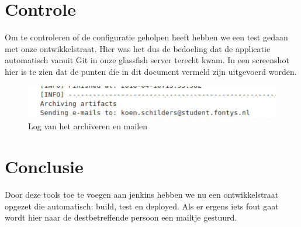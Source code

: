 \documentclass[12pt]{article}
\begin{document}
\section{Controle}
Om te controleren of de configuratie geholpen heeft hebben we een test gedaan met onze ontwikkelstraat. Hier was het dus de bedoeling dat de applicatie automatisch vanuit Git in onze glassfish server terecht kwam. In een screenshot hier is te zien dat de punten die in dit document vermeld zijn uitgevoerd worden.

\begin{figure}[H]
	\includegraphics[width=\textwidth]{images/Archivingandsendingemails.png}
	\caption{Log van het archiveren en mailen\label{fig:log}}
\end{figure}

\newpage
\section{Conclusie}
Door deze tools toe te voegen aan jenkins hebben we nu een ontwikkelstraat opgezet die automatisch: build, test en deployed. Als er ergens iets fout gaat wordt hier naar de destbetreffende persoon een mailtje gestuurd.
\end{document}
